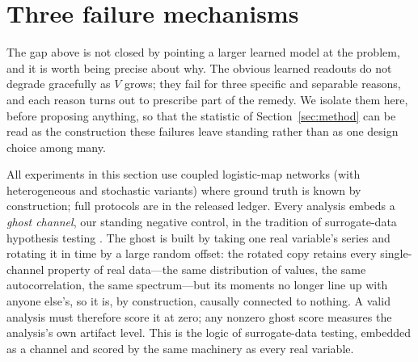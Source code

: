 \documentclass[11pt]{article}
\begin{document}
\section{Three failure mechanisms}
\label{sec:mechanisms}

The gap above is not closed by pointing a larger learned model at the problem, and it is worth being precise about why. The obvious learned readouts do not degrade gracefully as $V$ grows; they fail for three specific and separable reasons, and each reason turns out to prescribe part of the remedy. We isolate them here, before proposing anything, so that the statistic of Section~\ref{sec:method} can be read as the construction these failures leave standing rather than as one design choice among many.

All experiments in this section use coupled logistic-map networks (with
heterogeneous and stochastic variants) where ground truth is known by
construction; full protocols are in the released ledger. Every analysis
embeds a \emph{ghost channel}, our standing negative control, in the
tradition of surrogate-data hypothesis testing
\citep{theiler1992,ebisuzaki1997}. The ghost
is built by taking one real variable's series and rotating it in time by a
large random offset: the rotated copy retains every single-channel property
of real data---the same distribution of values, the same autocorrelation,
the same spectrum---but its moments no longer line up with anyone else's,
so it is, by construction, causally connected to nothing. A valid analysis
must therefore score it at zero; any nonzero ghost score measures the
analysis's own artifact level. This is the logic of surrogate-data testing,
embedded as a channel and scored by the same machinery as every real
variable.
\end{document}

